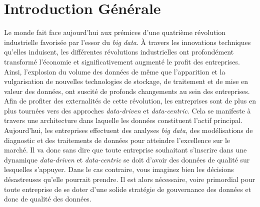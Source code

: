 \cleardoublepage
{}
{}
\vspace*{0.5cm}
\section*{\centering \Huge Introduction G\'en\'erale}
\titlerule[2.0pt]
\vspace{1cm}
Le monde fait face aujourd'hui aux prémices d’une quatrième révolution industrielle favoris\'ee par l'essor du \textit{big data}. \`A travers les innovations techniques qu'elles induisent, les diff\'erentes r\'evolutions industrielles ont profondément transformé l'économie et significativement augment\'e le profit des entreprises. Ainsi, l'explosion du volume des donn\'ees de m\^eme que l'apparition et la vulgarisation de nouvelles technologies de stockage, de traitement et de mise en valeur des donn\'ees, ont suscité de profonds changements au sein des entreprises. Afin de profiter des externalit\'es de cette r\'evolution, les entreprises sont de plus en plus tourn\'ees vers des approches \textit{data-driven} et \textit{data-centric}. Cela se manifeste \`a travers une architecture dans laquelle les données constituent l'actif principal.  Aujourd'hui, les entreprises effectuent des analyses \textit{big data}, des modélisations de diagnostic et des traitements de données pour atteindre l'excellence sur le marché. Il va donc sans dire que toute entreprise souhaitant s'inscrire dans une dynamique \textit{data-driven} et \textit{data-centric} se doit d'avoir des donn\'ees de qualit\'e sur lesquelles s'appuyer. Dans le cas contraire, vous imaginez bien les décisions désastreuses qu'elle  pourrait prendre. Il est alors n\'ecessaire, voire primordial pour toute entreprise de se doter d'une solide strat\'egie de gouvernance des donn\'ees et donc de qualit\'e des donn\'ees.\\

